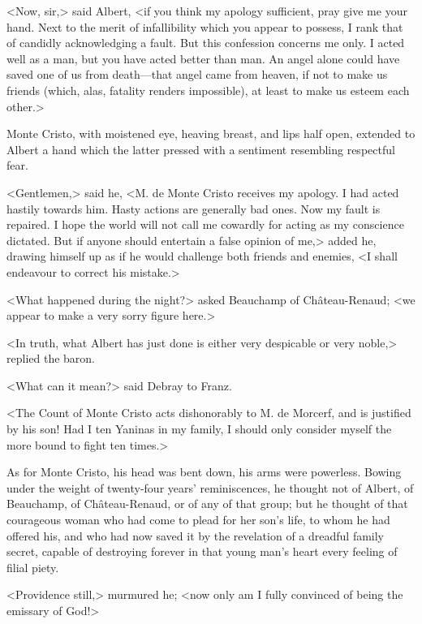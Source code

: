  <Now, sir,> said Albert, <if you think my apology sufficient, pray give me your hand. Next to the merit of infallibility which you appear to possess, I rank that of candidly acknowledging a fault. But this confession concerns me only. I acted well as a man, but you have acted better than man. An angel alone could have saved one of us from death—that angel came from heaven, if not to make us friends (which, alas, fatality renders impossible), at least to make us esteem each other.> 

 Monte Cristo, with moistened eye, heaving breast, and lips half open, extended to Albert a hand which the latter pressed with a sentiment resembling respectful fear. 

 <Gentlemen,> said he, <M. de Monte Cristo receives my apology. I had acted hastily towards him. Hasty actions are generally bad ones. Now my fault is repaired. I hope the world will not call me cowardly for acting as my conscience dictated. But if anyone should entertain a false opinion of me,> added he, drawing himself up as if he would challenge both friends and enemies, <I shall endeavour to correct his mistake.> 

 <What happened during the night?> asked Beauchamp of Château-Renaud; <we appear to make a very sorry figure here.> 

 <In truth, what Albert has just done is either very despicable or very noble,> replied the baron. 

 <What can it mean?> said Debray to Franz. 

 <The Count of Monte Cristo acts dishonorably to M. de Morcerf, and is justified by his son! Had I ten Yaninas in my family, I should only consider myself the more bound to fight ten times.> 

 As for Monte Cristo, his head was bent down, his arms were powerless. Bowing under the weight of twenty-four years' reminiscences, he thought not of Albert, of Beauchamp, of Château-Renaud, or of any of that group; but he thought of that courageous woman who had come to plead for her son's life, to whom he had offered his, and who had now saved it by the revelation of a dreadful family secret, capable of destroying forever in that young man's heart every feeling of filial piety. 

 <Providence still,> murmured he; <now only am I fully convinced of being the emissary of God!> 